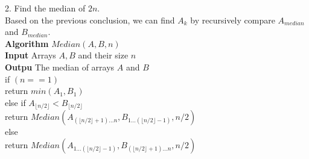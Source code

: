 \documentclass[a4paper]{article}
\begin{document}
2. Find the median of $2n$.\\
Based on the previous conclusion, we can find $A_k$ by recursively compare $A_{median}$ and $B_{median}$.\\
\textbf{Algorithm} $Median(A,B,n)$\\
\textbf{Input} Arrays $A, B$ and their size $n$\\
\textbf{Outpu} The median of arrays $A$ and $B$\\
\hspace*{1cm}if $(n==1)$\\
\hspace*{2cm}return $min(A_1, B_1)$\\
\hspace*{1cm}else if $A_{\lfloor{n/2}\rfloor} < B_{\lfloor{n/2}\rfloor}$\\
\hspace*{2cm}return $Median(A_{(\lfloor{n/2}\rfloor+1)\dots n}, B_{1\dots(\lfloor{n/2}\rfloor-1)}, n/2)$\\
\hspace*{1cm}else\\
\hspace*{2cm}return $Median(A_{1\dots(\lfloor{n/2}\rfloor-1)}, B_{(\lfloor{n/2}\rfloor+1)\dots n}, n/2)$\\
\end{document}
